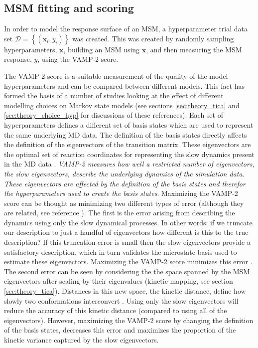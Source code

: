 \subsection{MSM fitting and scoring}\label{subsec:msm_fitting}


In order to  model the response surface of an MSM, a hyperparameter trial data set  $\mathcal{D} = \left\{ (\mathbf{x}_{i}, y_{i}) \right\}$ was created. This was created by  randomly sampling hyperparameters, $\mathbf{x}$, building an MSM using $\mathbf{x}$, and then measuring the MSM response, $y$, using the VAMP-2 score. 

The VAMP-2 score is a suitable measurement of the quality of the model hyperparameters and can be compared between different models. This fact has formed the basis of a number of studies \cite{ husicOptimizedParameterSelection2016, husicWardClusteringImproves2017a, schererVariationalSelectionFeatures2019} looking at the effect of different modelling choices on Markov state models (see sections \ref{sec:theory_tica} and \ref{sec:theory_choice_hyp} for discussions of these references).  Each set of hyperparameters defines a different set of basis states which are used to represent the same underlying MD data. The definition of the basis states directly affects the definition of the eigenvectors of the transition matrix. These eigenvectors  are the optimal set of reaction coordinates for representing the slow dynamics present in the MD data \cite{nuskeVariationalApproachMolecular2014}. \emph{VAMP-2 measures how well a restricted number of eigenvectors, the slow eigenvectors, describe the underlying dynamics of the simulation data. These eigenvectors are affected by the definition of the basis states and therefor the hyperparameters used to create the basis states}. Maximizing the VAMP-2 score can be thought as minimizing two different types of error (although they are related, see reference \cite{wuVariationalApproachLearning2020c}). The first is the error arising from describing the dynamics using only the slow dynamical processes. In other words: if we truncate our description to just a handful of eigenvectors how different is this to the true description? If this truncation error is small then the slow eigenvectors provide a satisfactory description, which in turn validates the microstate basis used to estimate these eigenvectors. Maximizing the VAMP-2 score minimizes this error \cite{wuVariationalApproachLearning2020c}. The second error can be seen by considering the the space spanned by the MSM eigenvectors after scaling by their eigenvalues (kinetic mapping, see section \ref{sec:theory_tica}). Distances in this new space, the kinetic distance,  define how slowly two conformations interconvert \cite{noeKineticDistanceKinetic2015}. Using only the slow eigenvectors will reduce the accuracy of this kinetic distance (compared to using all of the eigenvectors). However, maximizing the VAMP-2 score by changing the definition of the basis states, decreases this error and maximizes the proportion of the kinetic variance captured by the slow eigenvectors. 

